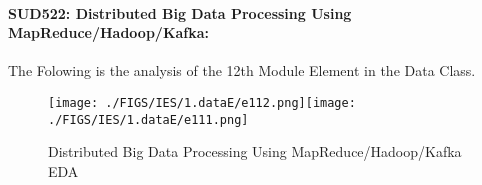 \documentclass[12pt]{extreport}
\begin{document}




\paragraph{\large SUD522: Distributed Big Data Processing Using MapReduce/Hadoop/Kafka:\\
} 
The Folowing is the analysis of the 12th Module Element in the Data Class.

\begin{figure}[H]
	\centering
	\texttt{[image: ./FIGS/IES/1.dataE/e112.png]}\texttt{[image: ./FIGS/IES/1.dataE/e111.png]}
	\caption{Distributed Big Data Processing Using MapReduce/Hadoop/Kafka EDA}
	\label{fig:17}
\end{figure}

\end{document}
